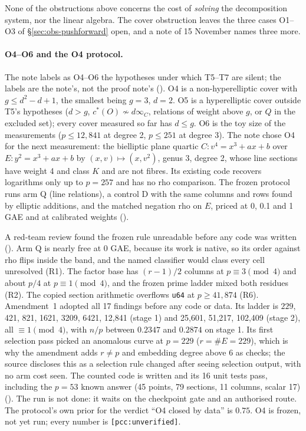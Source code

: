 None of the obstructions above concerns the cost of \emph{solving} the
decomposition system, nor the linear algebra. The cover obstruction leaves
the three cases O1--O3 of \S\ref{sec:obs-pushforward} open, and a note of
15 November names three more.

\paragraph{O4--O6 and the O4 protocol.} The note labels as O4--O6 the
hypotheses under which T5--T7 are silent; the labels are the note's, not
the proof note's ().
O4 is a non-hyperelliptic cover with $g\le d^2-d+1$, the smallest being
$g=3$, $d=2$. O5 is a hyperelliptic cover outside T5's hypotheses ($d>g$,
$c^*(O)\not\sim d\infty_C$, relations of weight above $g$, or $Q$ in the
excluded set); every cover measured so far has $d\le g$. O6 is the toy
size of the measurements ($p\le12{,}841$ at degree 2, $p\le251$ at
degree 3). The note chose O4 for the next measurement: the bielliptic
plane quartic $C:v^4=x^3+ax+b$ over $E:y^2=x^3+ax+b$ by
$(x,v)\mapsto(x,v^2)$, genus 3, degree 2, whose line sections have
weight 4 and class $K$ and are not fibres. Its existing code recovers
logarithms only up to $p=257$ and has no rho comparison. The frozen
protocol runs arm Q (line relations), a control D with the same columns
and rows found by elliptic additions, and the matched negation rho on
$E$, priced at 0, 0.1 and 1 GAE and at calibrated weights
().

A red-team review found the frozen rule unreadable before any code was
written (). Arm Q
is nearly free at 0 GAE, because its work is native, so its order against
rho flips inside the band, and the named classifier would class every cell
unresolved (R1). The factor base has $(r-1)/2$ columns at $p\equiv3\pmod
4$ and about $p/4$ at $p\equiv1\pmod 4$, and the frozen prime ladder mixed
both residues (R2). The copied section arithmetic overflows \texttt{u64}
at $p\ge41{,}874$ (R6). Amendment~1 adopted all 17 findings before any
code or data. Its ladder is $229$, 421, 821, 1621, 3209, 6421, 12{,}841
(stage 1) and 25{,}601, 51{,}217, 102{,}409 (stage 2), all $\equiv1\pmod
4$, with $n/p$ between $0.2347$ and $0.2874$ on stage 1. Its first
selection pass picked an anomalous curve at $p=229$ ($r=\#E=229$), which
is why the amendment adds $r\ne p$ and embedding degree above 6 as checks;
the source discloses this as a selection rule changed after seeing
selection output, with no arm cost seen. The counted code is written and
its 16 unit tests pass, including the $p=53$ known answer (45 points, 79
sections, 11 columns, scalar 17)
(). The run is
not done: it waits on the checkpoint gate and an authorised route. The
protocol's own prior for the verdict ``O4 closed by data'' is $0.75$. O4
is frozen, not yet run; every number is \texttt{[pcc:unverified]}.

